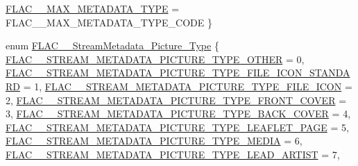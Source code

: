 \begin{DoxyCompactItemize}
\newline
\hyperlink{group__flac__format_ggac71714ba8ddbbd66d26bb78a427fac01a1a2f283a3dd9e7b46181d7a114ec5805}{F\+L\+A\+C\+\_\+\+\_\+\+M\+A\+X\+\_\+\+M\+E\+T\+A\+D\+A\+T\+A\+\_\+\+T\+Y\+PE} = F\+L\+A\+C\+\_\+\+\_\+\+M\+A\+X\+\_\+\+M\+E\+T\+A\+D\+A\+T\+A\+\_\+\+T\+Y\+P\+E\+\_\+\+C\+O\+DE
 \}
\item 
enum \hyperlink{group__flac__format_gaf6d3e836cee023e0b8d897f1fdc9825d}{F\+L\+A\+C\+\_\+\+\_\+\+Stream\+Metadata\+\_\+\+Picture\+\_\+\+Type} \{ \newline
\hyperlink{group__flac__format_ggaf6d3e836cee023e0b8d897f1fdc9825dadd6d6af32499b1973e48c9e8f13357ce}{F\+L\+A\+C\+\_\+\+\_\+\+S\+T\+R\+E\+A\+M\+\_\+\+M\+E\+T\+A\+D\+A\+T\+A\+\_\+\+P\+I\+C\+T\+U\+R\+E\+\_\+\+T\+Y\+P\+E\+\_\+\+O\+T\+H\+ER} = 0, 
\hyperlink{group__flac__format_ggaf6d3e836cee023e0b8d897f1fdc9825da5eca52e5cfcb718f33f5fce9b1021a49}{F\+L\+A\+C\+\_\+\+\_\+\+S\+T\+R\+E\+A\+M\+\_\+\+M\+E\+T\+A\+D\+A\+T\+A\+\_\+\+P\+I\+C\+T\+U\+R\+E\+\_\+\+T\+Y\+P\+E\+\_\+\+F\+I\+L\+E\+\_\+\+I\+C\+O\+N\+\_\+\+S\+T\+A\+N\+D\+A\+RD} = 1, 
\hyperlink{group__flac__format_ggaf6d3e836cee023e0b8d897f1fdc9825daaf44b9d5fb75dde6941463e5029aa351}{F\+L\+A\+C\+\_\+\+\_\+\+S\+T\+R\+E\+A\+M\+\_\+\+M\+E\+T\+A\+D\+A\+T\+A\+\_\+\+P\+I\+C\+T\+U\+R\+E\+\_\+\+T\+Y\+P\+E\+\_\+\+F\+I\+L\+E\+\_\+\+I\+C\+ON} = 2, 
\hyperlink{group__flac__format_ggaf6d3e836cee023e0b8d897f1fdc9825da3e20b405fd4e835ff3a4465b8bcb7c36}{F\+L\+A\+C\+\_\+\+\_\+\+S\+T\+R\+E\+A\+M\+\_\+\+M\+E\+T\+A\+D\+A\+T\+A\+\_\+\+P\+I\+C\+T\+U\+R\+E\+\_\+\+T\+Y\+P\+E\+\_\+\+F\+R\+O\+N\+T\+\_\+\+C\+O\+V\+ER} = 3, 
\newline
\hyperlink{group__flac__format_ggaf6d3e836cee023e0b8d897f1fdc9825da9ae132f2ee7d3baf35f94a9dc9640f62}{F\+L\+A\+C\+\_\+\+\_\+\+S\+T\+R\+E\+A\+M\+\_\+\+M\+E\+T\+A\+D\+A\+T\+A\+\_\+\+P\+I\+C\+T\+U\+R\+E\+\_\+\+T\+Y\+P\+E\+\_\+\+B\+A\+C\+K\+\_\+\+C\+O\+V\+ER} = 4, 
\hyperlink{group__flac__format_ggaf6d3e836cee023e0b8d897f1fdc9825dad3cb471b7925ae5034d9fd9ecfafb87a}{F\+L\+A\+C\+\_\+\+\_\+\+S\+T\+R\+E\+A\+M\+\_\+\+M\+E\+T\+A\+D\+A\+T\+A\+\_\+\+P\+I\+C\+T\+U\+R\+E\+\_\+\+T\+Y\+P\+E\+\_\+\+L\+E\+A\+F\+L\+E\+T\+\_\+\+P\+A\+GE} = 5, 
\hyperlink{group__flac__format_ggaf6d3e836cee023e0b8d897f1fdc9825dac994edc4166107ab5790e49f0b57ffd9}{F\+L\+A\+C\+\_\+\+\_\+\+S\+T\+R\+E\+A\+M\+\_\+\+M\+E\+T\+A\+D\+A\+T\+A\+\_\+\+P\+I\+C\+T\+U\+R\+E\+\_\+\+T\+Y\+P\+E\+\_\+\+M\+E\+D\+IA} = 6, 
\hyperlink{group__flac__format_ggaf6d3e836cee023e0b8d897f1fdc9825da1282e252e20553c39907074052960f42}{F\+L\+A\+C\+\_\+\+\_\+\+S\+T\+R\+E\+A\+M\+\_\+\+M\+E\+T\+A\+D\+A\+T\+A\+\_\+\+P\+I\+C\+T\+U\+R\+E\+\_\+\+T\+Y\+P\+E\+\_\+\+L\+E\+A\+D\+\_\+\+A\+R\+T\+I\+ST} = 7, 

\end{DoxyCompactItemize}
